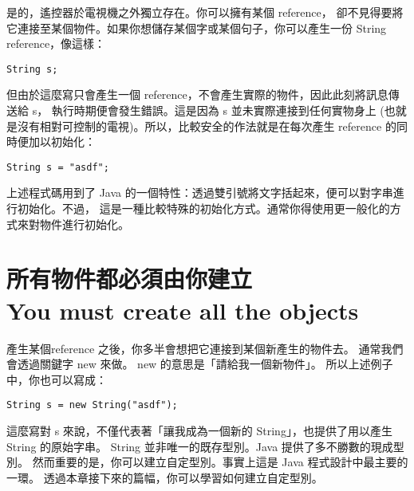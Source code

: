 是的，遙控器於電視機之外獨立存在。你可以擁有某個 reference，
卻不見得要將它連接至某個物件。如果你想儲存某個字或某個句子，你可以產生一份
String reference，像這樣：

\begin{Verbatim}[frame=single]
String s;
\end{Verbatim}

但由於這麼寫只會產生一個 reference，不會產生實際的物件，因此此刻將訊息傳送給 s，
執行時期便會發生錯誤。這是因為 s 並未實際連接到任何實物身上
(也就是沒有相對可控制的電視)。所以，比較安全的作法就是在每次產生
reference 的同時便加以初始化：

\begin{Verbatim}[frame=single]
String s = "asdf";
\end{Verbatim}

上述程式碼用到了
Java 的一個特性：透過雙引號將文字括起來，便可以對字串進行初始化。不過，
這是一種比較特殊的初始化方式。通常你得使用更一般化的方式來對物件進行初始化。
\section[所有物件都必須由你建立]{所有物件都必須由你建立 \\
You must create all the objects}
產生某個reference 之後，你多半會想把它連接到某個新產生的物件去。
通常我們會透過關鍵字 new 來做。 new 的意思是「請給我一個新物件」。
所以上述例子中，你也可以寫成：

\begin{Verbatim}[frame=single]
String s = new String("asdf");
\end{Verbatim}

這麼寫對 s 來說，不僅代表著「讓我成為一個新的 String」，也提供了用以產生 String
的原始字串。 String 並非唯一的既存型別。Java 提供了多不勝數的現成型別。
然而重要的是，你可以建立自定型別。事實上這是 Java 程式設計中最主要的一環。
透過本章接下來的篇幅，你可以學習如何建立自定型別。
